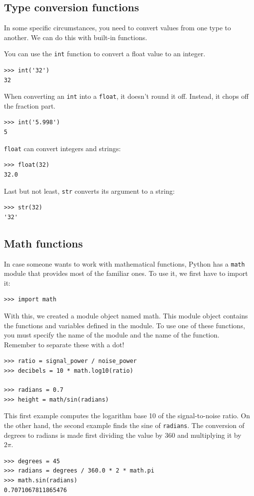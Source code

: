 \subsection{Type conversion functions}
In some specific circumstances, you need to convert values from one type to another. We can do this with built-in functions. 

You can use the \texttt{int} function to convert a float value to an integer.
\begin{verbatim}
>>> int('32')
32
\end{verbatim}
When converting an \texttt{int} into a \texttt{float}, it doesn't round it off. Instead, it chops off the fraction part. 
\begin{verbatim}
>>> int('5.998')
5
\end{verbatim}
\texttt{float} can convert integers and strings:
\begin{verbatim}
>>> float(32)
32.0
\end{verbatim}
Last but not least, \texttt{str} converts its argument to a string:
\begin{verbatim}
>>> str(32)
'32'
\end{verbatim}

\subsection{Math functions}
In case someone wants to work with mathematical functions, Python has a \texttt{math} module that provides most of the familiar ones. To use it, we first have to import it:
\begin{verbatim}
>>> import math
\end{verbatim}

With this, we created a module object named math. This module object contains the functions and variables defined in the module. To use one of these functions, you must specify the name of the module and the name of the function. Remember to separate these with a dot! 
\begin{verbatim}
>>> ratio = signal_power / noise_power
>>> decibels = 10 * math.log10(ratio)

>>> radians = 0.7
>>> height = math/sin(radians)
\end{verbatim}

This first example computes the logarithm base 10 of the signal-to-noise ratio. On the other hand, the second example finds the sine of \texttt{radians}. The conversion of degrees to radians is made first dividing the value by 360 and multiplying it by $2\pi$.
\begin{verbatim}
>>> degrees = 45
>>> radians = degrees / 360.0 * 2 * math.pi
>>> math.sin(radians)
0.7071067811865476
\end{verbatim}

